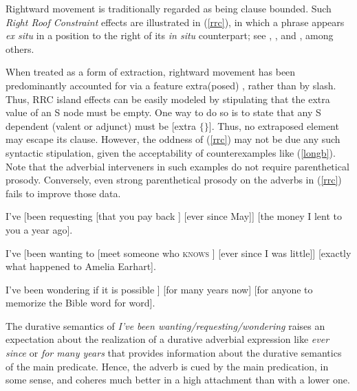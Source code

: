 \documentclass[output=paper
                ,modfonts
                ,nonflat
	        ,collection
	        ,collectionchapter
	        ,collectiontoclongg
 	        ,biblatex
                ,babelshorthands
                ,newtxmath
                ,draftmode
                ,colorlinks, citecolor=brown
]{./langsci/langscibook}
\begin{document}
Rightward movement is traditionally regarded as being clause bounded. Such
 \emph{Right Roof Constraint}  \citep{Ross67} effects are illustrated in (\ref{rrc}), 
in which a phrase appears \emph{ex situ} in a position 
to the right of its \emph{in situ} counterpart; see   \citet{akma75}, \citet{baltin78}, and  \citet{stowelldiss}, among others.

\eal \label{rrc}
\zl



\noindent
When treated as a form of extraction, rightward movement has been predominantly
accounted for via a feature {\sc extra(posed)} \citep{Keller95b,Noord:Bouma:96,eynde96,
kellerverb,Mueller99a,KimSag2005}, rather than by {\sc slash}.  
Thus, RRC island effects can be easily modeled by stipulating that the  {\sc extra} value of an S node must be empty. One way to do so is to state that any S dependent (valent or adjunct) must be [{\sc extra} $\lbrace \rbrace$].
Thus, no extraposed element may escape its clause. However,  the oddness of (\ref{rrc}) may not be due any such syntactic stipulation, given the acceptability of counterexamples like (\ref{longb}). Note that the adverbial interveners in such examples do not  require parenthetical prosody. Conversely, even strong  parenthetical
prosody on the adverbs in (\ref{rrc}) fails to improve those data.


\eal \label{longb}
\ex  I've [been requesting [that you pay back \spc] [ever since May]] [the money
I lent to you a year ago].\\
  \citep[251]{kayne00}

\ex I've [been wanting to [meet someone
who \textsc{knows} \spc] [ever since I was little]] [exactly what happened to Amelia Earhart].

\ex  I've been wondering  if it is possible   \spc]
[for many years now] [for anyone to memorize the Bible word for word].\\
\citep[861]{chavesrnr}
\zl


\noindent
The  durative semantics  of   \emph{I've been wanting/requesting/wondering} 
 raises an expectation about the realization of   a durative  
adverbial expression like  \emph{ever since} or \emph{for many years} that
provides information about the durative semantics of the main predicate.
Hence, the adverb is cued by the main predication, in some sense, and 
  coheres much better in a high attachment than with a lower one.
\end{document}
